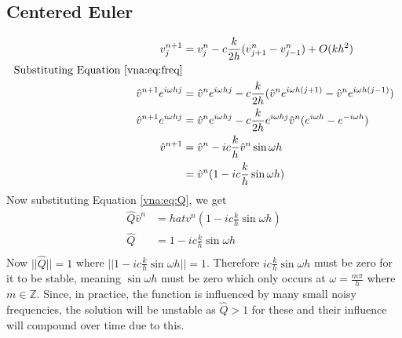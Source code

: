 \subsection{Centered Euler}
\begin{align*}
    v_j^{n+1}	&= v_j^n - c\frac{k}{2h}(v_{j+1}^n - v_{j-1}^n) + O(kh^2)	\\
    \text{Substituting Equation \ref{vna:eq:freq}} 				\\
    \hat{v}^{n+1}e^{i\omega hj} &= \hat{v}^ne^{i\omega hj} - c\frac{k}{2h} (\hat{v}^ne^{i\omega h(j+1)} - \hat{v}^ne^{i\omega h(j-1)})						    \\
    \hat{v}^{n+1}e^{i\omega hj} &= \hat{v}^ne^{i\omega hj} - c\frac{k}{2h} e^{i\omega hj} \hat{v}^n (e^{i\omega h} - e^{-i\omega h})							    \\
    \hat{v}^{n+1} &= \hat{v}^n - ic\frac{k}{h} \hat{v}^n \sin{\omega h}		\\
		  &= \hat{v}^n(1 - ic\frac{k}{h} \sin{\omega h})
\end{align*}
Now substituting Equation \ref{vna:eq:Q}, we get
\begin{align*}
    \hat{Q}\hat{v}^n &= hat{v}^n(1 - ic\frac{k}{h} \sin{\omega h})	\\
    \hat{Q} &= 1 - ic\frac{k}{h} \sin{\omega h}				\\
\end{align*}
Now $||\hat{Q}|| = 1$ where $||1 - ic\frac{k}{h} \sin{\omega h}|| = 1$. Therefore $ic\frac{k}{h} \sin{\omega h}$ must be zero for it to be stable, meaning $\sin{\omega h}$ must be zero which only occurs at $\omega=\frac{m\pi}{h}$ where $m \in \mathbb{Z}$. Since, in practice, the function is influenced by many small noisy frequencies, the solution will be unstable as $\hat{Q}>1$ for these and their influence will compound over time due to this.
